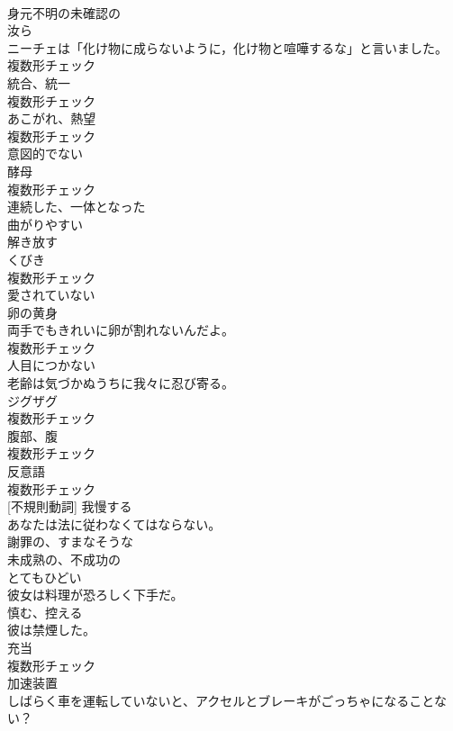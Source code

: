\documentclass[8pt]{extreport}
\begin{document}
\begin{CJK}{UTF8}{min}
\\	[形容詞]	身元不明の未確認の	
\\	[名詞]	汝ら	
\\	ニーチェは「化け物に成らないように，化け物と喧嘩するな」と言いました。	
\\	複数形チェック
\\	[名詞]	統合、統一	
\\	複数形チェック
\\	[名詞]	あこがれ、熱望	
\\	複数形チェック
\\	[形容詞]	意図的でない	
\\	[名詞]	酵母	
\\	複数形チェック
\\	[形容詞]	連続した、一体となった	
\\	[形容詞]	曲がりやすい	
\\	[動詞]	解き放す	
\\	[名詞]	くびき	
\\	複数形チェック
\\	[形容詞]	愛されていない	
\\	[名詞]	卵の⻩身	
\\	両手でもきれいに卵が割れないんだよ。	
\\	複数形チェック
\\	[形容詞]	人目につかない	
\\	老齢は気づかぬうちに我々に忍び寄る。	
\\	[名詞]	ジグザグ	
\\	複数形チェック
\\	[名詞]	腹部、腹	
\\	複数形チェック
\\	[名詞]	反意語	
\\	複数形チェック
\\	[動詞] [不規則動詞]	我慢する	
\\	あなたは法に従わなくてはならない。	
\\	[形容詞]	謝罪の、すまなそうな	
\\	[形容詞]	未成熟の、不成功の	
\\	[形容詞]	とてもひどい	
\\	彼女は料理が恐ろしく下手だ。	
\\	[動詞]	慎む、控える	
\\	彼は禁煙した。	
\\	[名詞]	充当	
\\	複数形チェック
\\	[名詞]	加速装置	
\\	しばらく車を運転していないと、アクセルとブレーキがごっちゃになることない？	

\end{CJK}
\end{document}
